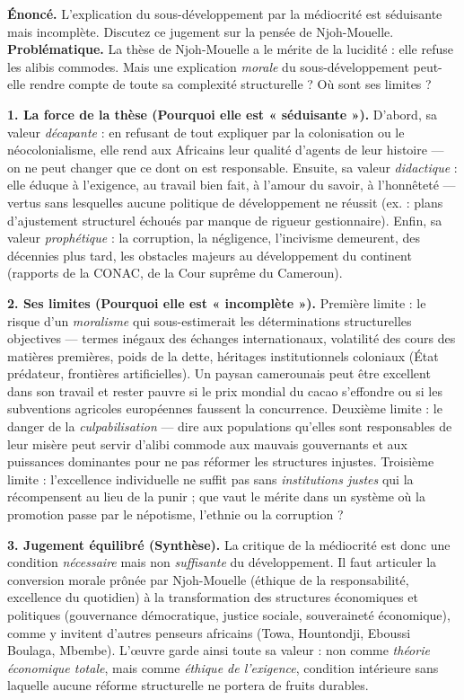 \documentclass[11pt]{article}
\begin{document}
\begin{exoresolu}
\textbf{Énoncé.} \guillemotleft L'explication du sous-développement par la médiocrité est séduisante mais incomplète. \guillemotright Discutez ce jugement sur la pensée de Njoh-Mouelle.
\tcblower
\textbf{Problématique.} La thèse de Njoh-Mouelle a le mérite de la lucidité : elle refuse les alibis commodes. Mais une explication \emph{morale} du sous-développement peut-elle rendre compte de toute sa complexité structurelle ? Où sont ses limites ?

\textbf{1. La force de la thèse (Pourquoi elle est « séduisante »).} D'abord, sa valeur \emph{décapante} : en refusant de tout expliquer par la colonisation ou le néocolonialisme, elle rend aux Africains leur qualité d'agents de leur histoire — on ne peut changer que ce dont on est responsable. Ensuite, sa valeur \emph{didactique} : elle éduque à l'exigence, au travail bien fait, à l'amour du savoir, à l'honnêteté — vertus sans lesquelles aucune politique de développement ne réussit (ex. : plans d'ajustement structurel échoués par manque de rigueur gestionnaire). Enfin, sa valeur \emph{prophétique} : la corruption, la négligence, l'incivisme demeurent, des décennies plus tard, les obstacles majeurs au développement du continent (rapports de la CONAC, de la Cour suprême du Cameroun).

\textbf{2. Ses limites (Pourquoi elle est « incomplète »).} Première limite : le risque d'un \emph{moralisme} qui sous-estimerait les déterminations structurelles objectives — termes inégaux des échanges internationaux, volatilité des cours des matières premières, poids de la dette, héritages institutionnels coloniaux (État prédateur, frontières artificielles). Un paysan camerounais peut être excellent dans son travail et rester pauvre si le prix mondial du cacao s'effondre ou si les subventions agricoles européennes faussent la concurrence. Deuxième limite : le danger de la \emph{culpabilisation} — dire aux populations qu'elles sont responsables de leur misère peut servir d'alibi commode aux mauvais gouvernants et aux puissances dominantes pour ne pas réformer les structures injustes. Troisième limite : l'excellence individuelle ne suffit pas sans \emph{institutions justes} qui la récompensent au lieu de la punir ; que vaut le mérite dans un système où la promotion passe par le népotisme, l'ethnie ou la corruption ?

\textbf{3. Jugement équilibré (Synthèse).} La critique de la médiocrité est donc une condition \emph{nécessaire} mais non \emph{suffisante} du développement. Il faut articuler la conversion morale prônée par Njoh-Mouelle (éthique de la responsabilité, excellence du quotidien) à la transformation des structures économiques et politiques (gouvernance démocratique, justice sociale, souveraineté économique), comme y invitent d'autres penseurs africains (Towa, Hountondji, Eboussi Boulaga, Mbembe). L'œuvre garde ainsi toute sa valeur : non comme \emph{théorie économique totale}, mais comme \emph{éthique de l'exigence}, condition intérieure sans laquelle aucune réforme structurelle ne portera de fruits durables.


\end{exoresolu}
\end{document}
